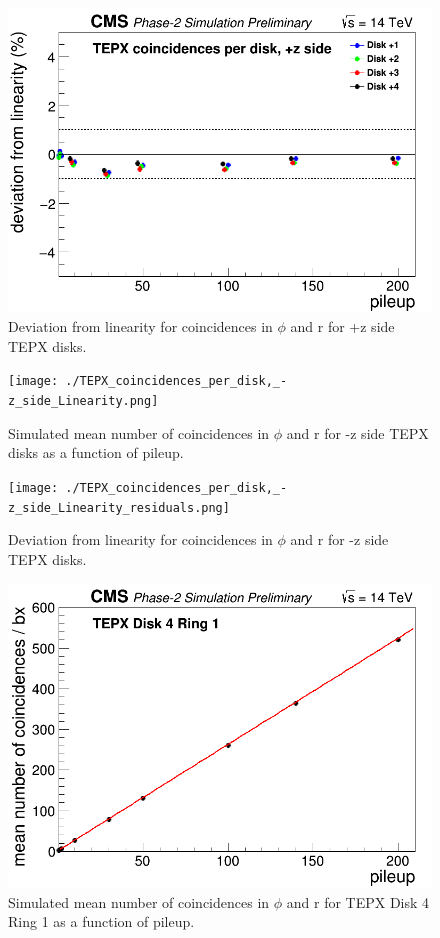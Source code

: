 \begin{figure}[H]
  \centering
  \includegraphics[width=0.5\columnwidth]{./TEPX_coincidences_per_disk__pz_side_mean_number_of_coincidences___bx_Linearity_residuals.png}
  \caption{Deviation from linearity for coincidences in $\phi$ and r for +z side TEPX disks.}
  \label{fig:CMS}
\end{figure}


\begin{figure}[H]
  \centering
  \texttt{[image: ./TEPX\_coincidences\_per\_disk,\_-z\_side\_Linearity.png]}
  \caption{Simulated mean number of coincidences in $\phi$ and r for -z side TEPX disks as a function of pileup.}
  \label{fig:CMS}
\end{figure}


\begin{figure}[H]
  \centering
  \texttt{[image: ./TEPX\_coincidences\_per\_disk,\_-z\_side\_Linearity\_residuals.png]}
  \caption{Deviation from linearity for coincidences in $\phi$ and r for -z side TEPX disks.}
  \label{fig:CMS}
\end{figure}


\begin{figure}[H]
  \centering
  \includegraphics[width=0.5\columnwidth]{./TEPX_Disk_4_Ring_1_mean_number_of_coincidences___bx_Linearity.png}
  \caption{Simulated mean number of coincidences in $\phi$ and r for TEPX Disk 4 Ring 1 as a function of pileup.}
  \label{fig:CMS}
\end{figure}


